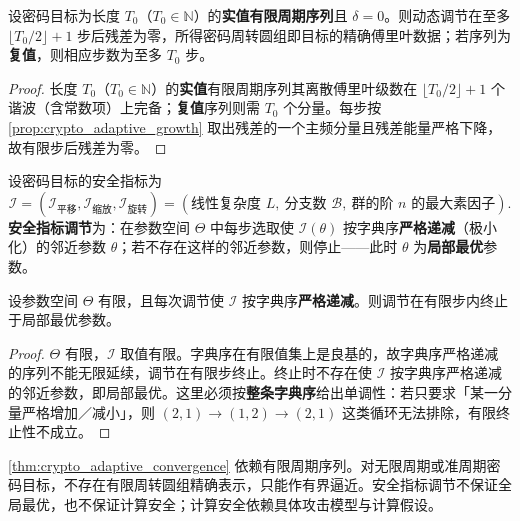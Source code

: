 \begin{theorem}[动态调节的收敛性]\label{thm:crypto_adaptive_convergence}
设密码目标为长度 $T_0$（$T_0\in\mathbb N$）的\textbf{实值有限周期序列}且 $\delta=0$。则动态调节在至多 $\lfloor T_0/2\rfloor+1$ 步后残差为零，所得密码周转圆组即目标的精确傅里叶数据；若序列为\textbf{复值}，则相应步数为至多 $T_0$ 步。
\end{theorem}

\begin{proof}
长度 $T_0$（$T_0\in\mathbb N$）的\textbf{实值}有限周期序列其离散傅里叶级数在 $\lfloor T_0/2\rfloor+1$ 个谐波（含常数项）上完备；\textbf{复值}序列则需 $T_0$ 个分量。每步按 \cref{prop:crypto_adaptive_growth} 取出残差的一个主频分量且残差能量严格下降，故有限步后残差为零。
\end{proof}

\begin{definition}[安全指标调节]\label{def:crypto_security_metric_adjustment}
设密码目标的安全指标为
\[
\mathcal I=(\mathcal I_{\mathrm{平移}},\mathcal I_{\mathrm{缩放}},\mathcal I_{\mathrm{旋转}})
=(\text{线性复杂度 }L,\ \text{分支数 }\mathcal B,\ \text{群的阶 }n\text{ 的最大素因子}).
\]
\textbf{安全指标调节}为：在参数空间 $\Theta$ 中每步选取使 $\mathcal I(\theta)$ 按字典序\textbf{严格递减}（极小化）的邻近参数 $\theta$；若不存在这样的邻近参数，则停止——此时 $\theta$ 为\textbf{局部最优}参数。
\end{definition}

\begin{proposition}[安全指标调节的有限收敛]\label{prop:crypto_security_metric_convergence}
设参数空间 $\Theta$ 有限，且每次调节使 $\mathcal I$ 按字典序\textbf{严格递减}。则调节在有限步内终止于局部最优参数。
\end{proposition}

\begin{proof}
$\Theta$ 有限，$\mathcal I$ 取值有限。字典序在有限值集上是良基的，故字典序严格递减的序列不能无限延续，调节在有限步终止。终止时不存在使 $\mathcal I$ 按字典序严格递减的邻近参数，即局部最优。这里必须按\textbf{整条字典序}给出单调性：若只要求「某一分量严格增加／减小」，则 $(2,1)\to(1,2)\to(2,1)$ 这类循环无法排除，有限终止性不成立。
\end{proof}

\begin{remark}[动态调节的边界]\label{rem:crypto_adaptive_boundary}
\cref{thm:crypto_adaptive_convergence} 依赖有限周期序列。对无限周期或准周期密码目标，不存在有限周转圆组精确表示，只能作有界逼近。安全指标调节不保证全局最优，也不保证计算安全；计算安全依赖具体攻击模型与计算假设。
\end{remark}

